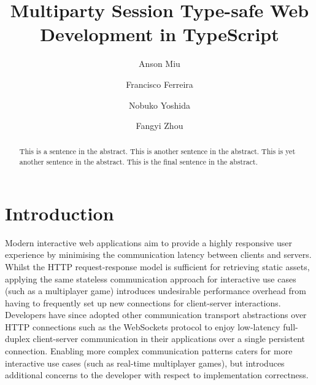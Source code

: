 \documentclass[submission,copyright,creativecommons]{eptcs}
\title{Multiparty Session Type-safe Web Development in TypeScript}
\author{Anson Miu
\institute{Imperial College London}
\and
Francisco Ferreira
\institute{Imperial College London}
\and
Nobuko Yoshida
\institute{Imperial College London}
\and
Fangyi Zhou
\institute{Imperial College London}
}
\begin{document}
\maketitle

\begin{abstract}



This is a sentence in the abstract.
This is another sentence in the abstract.
This is yet another sentence in the abstract.
This is the final sentence in the abstract.





\end{abstract}

\section{Introduction}

Modern interactive web applications aim to provide a highly responsive user experience by minimising the communication latency between clients and servers. 
Whilst the HTTP request-response model is sufficient for retrieving static assets, applying the same stateless communication approach for interactive use cases (such as a multiplayer game) introduces undesirable performance overhead from having to frequently set up new connections for client-server interactions. 
Developers have since adopted other communication transport abstractions over HTTP connections such as the WebSockets protocol \cite{WebSocketRFC} to enjoy low-latency full-duplex client-server communication in their applications over a single persistent connection. 
Enabling more complex communication patterns caters for more interactive use cases (such as real-time multiplayer games), but introduces additional concerns to the developer with respect to implementation correctness.
\end{document}
